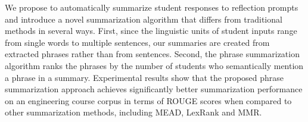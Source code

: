 We propose to automatically summarize student responses to reflection prompts and introduce a novel summarization algorithm that differs from traditional methods in several ways. First, since the linguistic units of student inputs range from single words to multiple sentences, our summaries are created from extracted phrases rather than from sentences.                     Second, the phrase summarization algorithm ranks the phrases by the number of students who semantically mention a phrase in a summary. Experimental results show that the proposed phrase summarization approach achieves significantly better summarization performance on an engineering course corpus in terms of ROUGE scores when compared to other summarization methods, including MEAD, LexRank and MMR.

